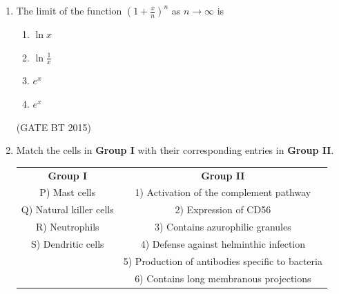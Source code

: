 \documentclass[journal,12pt,onecolumn]{IEEEtran}
\begin{document}
\begin{enumerate}[label=\textbf{Q.\arabic*}]
\begin{table}[H]
\begin{tabular}{cc}
\end{tabular}
\end{table}

\begin{multicols}{2}
\begin{enumerate}
    \item P-1, Q-6, R-3, S-4
    \item P-2, Q-6, R-3, S-5
    \item P-1, Q-3, R-6, S-5
    \item P-2, Q-3, R-6, S-4
\end{enumerate}
\end{multicols}\hfill (GATE BT 2015)


\item The limit of the function $\left(1 + \tfrac{x}{n}\right)^{n}$ as $n \to \infty$ is

\begin{multicols}{2}
\begin{enumerate}
    \item $\ln x$
    \item $\ln \tfrac{1}{x}$
    \item $e^{x}$
    \item $e^{x}$ %
\end{enumerate}
\end{multicols}\hfill (GATE BT 2015)


\item Match the cells in \textbf{Group I} with their corresponding entries in \textbf{Group II}.  

\begin{table}[H]
\begin{tabular}{cc}
\textbf{Group I} & \textbf{Group II} \\
P) Mast cells              & 1) Activation of the complement pathway \\
Q) Natural killer cells    & 2) Expression of CD56 \\
R) Neutrophils             & 3) Contains azurophilic granules \\
S) Dendritic cells         & 4) Defense against helminthic infection \\
                          & 5) Production of antibodies specific to bacteria \\
                          & 6) Contains long membranous projections \\
\end{tabular}
\end{table}


\end{enumerate}
\end{document}
